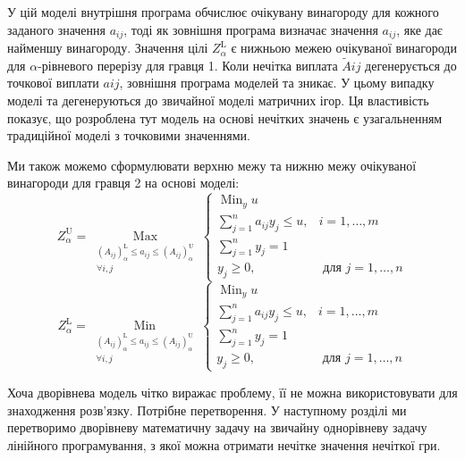 \documentclass[14pt, a4paper, oneside]{extarticle}
\numberwithin{equation}{section}
\begin{document}
У цій моделі внутрішня програма обчислює очікувану винагороду для кожного заданого значення $a_{i j}$, тоді як зовнішня програма визначає значення $a_{i j}$, яке дає найменшу винагороду. Значення цілі $Z_{\alpha}^{\mathrm{L}}$ є нижньою межею очікуваної винагороди для $\alpha$-рівневого перерізу для гравця 1. Коли нечітка виплата $\tilde{A}{i j}$ дегенерується до точкової виплати $a{i j}$, зовнішня програма моделей та зникає. У цьому випадку моделі та дегенеруються до звичайної моделі матричних ігор. Ця властивість показує, що розроблена тут модель на основі нечітких значень є узагальненням традиційної моделі з точковими значеннями.

Ми також можемо сформулювати верхню межу та нижню межу очікуваної винагороди для гравця 2 на основі моделі:
\begin{equation}
Z_{\alpha}^{\mathrm{U}}=\underset{\substack{\left(A_{i j}\right)_{\alpha}^{\mathrm{L}} \leq a_{i j} \leq\left(A_{i j}\right)_{\alpha}^{\mathrm{U}} \\
\forall i, j}}{\operatorname{Max}}\left\{\begin{array}{ll}
\operatorname{Min}_{y} u \\
\sum_{j=1}^{n} a_{i j} y_{j} \leq u, & i=1, \ldots, m \\
\sum_{j=1}^{n} y_{j}=1 \\
y_{j} \geq 0, & \text { для } j=1, \ldots, n
\end{array}\right.
\end{equation}
\begin{equation}
Z_{\alpha}^{\mathrm{L}}=\underset{\substack{\left(A_{i j}\right)_{\alpha}^{\mathrm{L}} \leq a_{i j} \leq\left(A_{i j}\right)_{\alpha}^{\mathrm{U}} \\
\forall i, j}}{\operatorname{Min}}\left\{\begin{array}{ll}
\operatorname{Min}_{y} u \\
\sum_{j=1}^{n} a_{i j} y_{j} \leq u, & i=1, \ldots, m \\
\sum_{j=1}^{n} y_{j}=1 \\
y_{j} \geq 0, & \text { для } j=1, \ldots, n
\end{array}\right.
\end{equation}

Хоча дворівнева модель чітко виражає проблему, її не можна використовувати для знаходження розв'язку. Потрібне перетворення. У наступному розділі ми перетворимо дворівневу математичну задачу на звичайну однорівневу задачу лінійного програмування, з якої можна отримати нечітке значення нечіткої гри.
\end{document}
